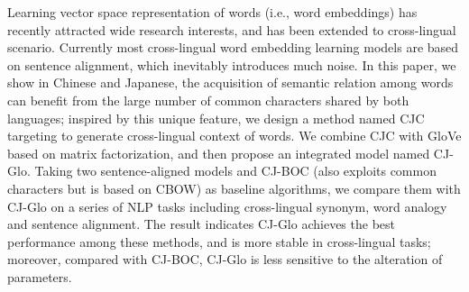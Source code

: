 Learning vector space representation of words (i.e., word embeddings) has recently attracted wide research interests, and has been extended to cross-lingual scenario. Currently most cross-lingual word embedding learning models are based on sentence alignment, which inevitably introduces much noise. In this paper, we show in Chinese and Japanese, the acquisition of semantic relation among words can benefit from the large number of common characters shared by both languages; inspired by this unique feature, we design a method named CJC  targeting to generate cross-lingual context of words. We combine CJC with GloVe based on matrix factorization, and then propose an integrated model named CJ-Glo. Taking two sentence-aligned models and CJ-BOC (also exploits common characters but is based on CBOW) as baseline algorithms, we compare them with CJ-Glo on a series of NLP tasks including cross-lingual synonym, word analogy and sentence alignment. The result indicates CJ-Glo achieves the best performance among these methods, and is more stable in cross-lingual tasks; moreover, compared with CJ-BOC, CJ-Glo is less sensitive to the alteration of parameters.

